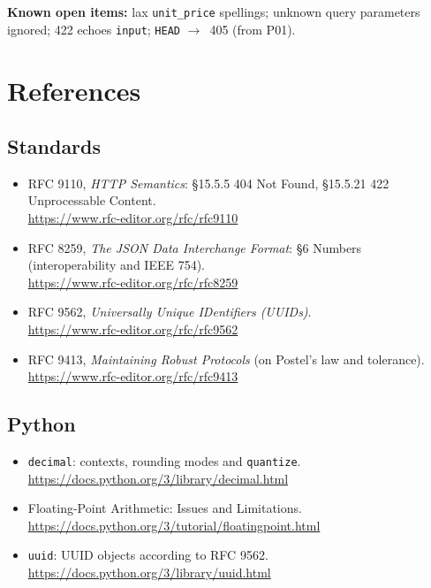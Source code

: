 \documentclass[11pt,a4paper]{article}
\newcommand{\code}[1]{\texttt{#1}}
\newcommand{\ra}{$\rightarrow$}
\begin{document}
\textbf{Known open items:} lax \code{unit\_price}
spellings; unknown query parameters ignored; 422 echoes \code{input}; \code{HEAD}
\ra\ 405 (from P01).

\section{References}\label{sec:refs}

\subsection*{Standards}
\begin{itemize}
  \item RFC 9110, \emph{HTTP Semantics}: \S15.5.5 404 Not Found, \S15.5.21 422 Unprocessable Content.\\
    \url{https://www.rfc-editor.org/rfc/rfc9110}
  \item RFC 8259, \emph{The JSON Data Interchange Format}: \S6 Numbers (interoperability and IEEE 754).\\
    \url{https://www.rfc-editor.org/rfc/rfc8259}
  \item RFC 9562, \emph{Universally Unique IDentifiers (UUIDs)}.\\
    \url{https://www.rfc-editor.org/rfc/rfc9562}
  \item RFC 9413, \emph{Maintaining Robust Protocols} (on Postel's law and tolerance).\\
    \url{https://www.rfc-editor.org/rfc/rfc9413}
\end{itemize}

\subsection*{Python}
\begin{itemize}
  \item \code{decimal}: contexts, rounding modes and \code{quantize}.\\
    \url{https://docs.python.org/3/library/decimal.html}
  \item Floating-Point Arithmetic: Issues and Limitations.\\
    \url{https://docs.python.org/3/tutorial/floatingpoint.html}
  \item \code{uuid}: UUID objects according to RFC 9562.\\
    \url{https://docs.python.org/3/library/uuid.html}
\end{itemize}
\end{document}
